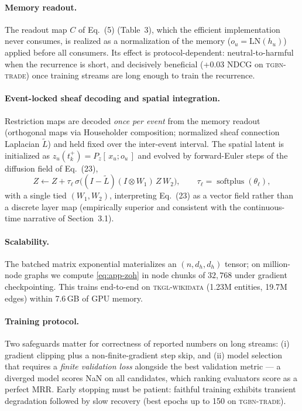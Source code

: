 \paragraph{Memory readout.}
The readout map $C$ of Eq.~(5) (Table~3), which the efficient
implementation never consumes, is realized as a normalization of the
memory ($o_u = \mathrm{LN}(h_u)$) applied before all consumers. Its
effect is protocol-dependent: neutral-to-harmful when the recurrence
is short, and decisively beneficial (+0.03 NDCG on
\textsc{tgbn-trade}) once training streams are long enough to train
the recurrence.

\paragraph{Event-locked sheaf decoding and spatial integration.}
Restriction maps are decoded \emph{once per event} from the memory
readout (orthogonal maps via Householder composition; normalized
sheaf connection Laplacian $\tilde L$) and held fixed over the
inter-event interval. The spatial latent is initialized as
$z_u(t_k^+) = P_z[\,x_u; o_u\,]$ and evolved by forward-Euler steps
of the diffusion field of Eq.~(23),
\begin{equation}
Z \leftarrow Z + \tau_\ell\,
\sigma\big((I - \tilde L)(I \otimes W_1)\, Z\, W_2\big),
\qquad \tau_\ell = \operatorname{softplus}(\theta_\ell),
\end{equation}
with a single tied $(W_1, W_2)$, interpreting Eq.~(23) as a vector
field rather than a discrete layer map (empirically superior and
consistent with the continuous-time narrative of Section~3.1).

\paragraph{Scalability.}
The batched matrix exponential materializes an
$(n, d_h, d_h)$ tensor; on million-node graphs we compute
\eqref{eq:app-zoh} in node chunks of $32{,}768$ under gradient
checkpointing. This trains end-to-end on \textsc{tkgl-wikidata}
(1.23M entities, 19.7M edges) within 7.6\,GB of GPU memory.

\paragraph{Training protocol.}
Two safeguards matter for correctness of reported numbers on long
streams: (i) gradient clipping plus a non-finite-gradient step skip,
and (ii) model selection that requires a \emph{finite validation
loss} alongside the best validation metric --- a diverged model
scores NaN on all candidates, which ranking evaluators score as a
perfect MRR. Early stopping must be patient: faithful training
exhibits transient degradation followed by slow recovery (best epochs
up to 150 on \textsc{tgbn-trade}).

